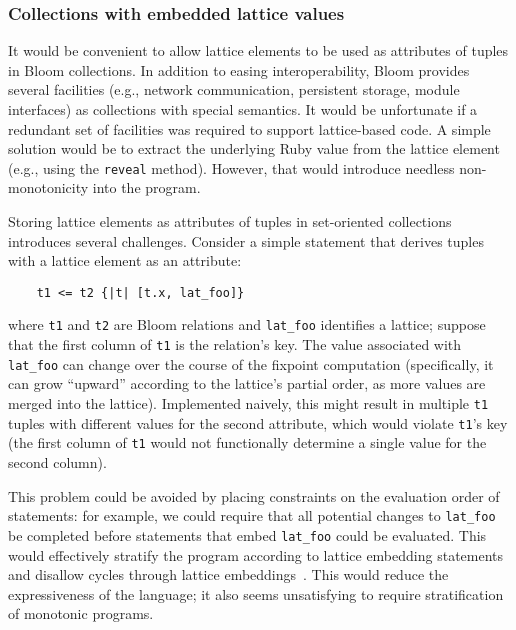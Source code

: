 \subsubsection{Collections with embedded lattice values}
\label{sec:lattice-embedding}


It would be convenient to allow lattice elements to be used as attributes of
tuples in Bloom collections. In addition to easing interoperability, Bloom
provides several facilities (e.g., network communication, persistent storage,
module interfaces) as collections with special semantics.  It would be
unfortunate if a redundant set of facilities was required to support
lattice-based code. A simple solution would be to extract the underlying Ruby
value from the lattice element (e.g., using the \texttt{reveal} method).
However, that would introduce needless non-monotonicity into the program.

Storing lattice elements as attributes of tuples in set-oriented collections
introduces several challenges. Consider a simple \lang statement that derives
tuples with a lattice element as an attribute:
\begin{verbatim}
    t1 <= t2 {|t| [t.x, lat_foo]}
\end{verbatim}
where \texttt{t1} and \texttt{t2} are Bloom relations and \texttt{lat\_foo}
identifies a lattice; suppose that the first column of \texttt{t1} is the
relation's key. The value associated with \texttt{lat\_foo} can change over the
course of the fixpoint computation (specifically, it can grow ``upward''
according to the lattice's partial order, as more values are merged into the
lattice). Implemented naively, this might result in multiple \texttt{t1} tuples
with different values for the second attribute, which would violate
\texttt{t1}'s key (the first column of \texttt{t1} would not functionally
determine a single value for the second column).

This problem could be avoided by placing constraints on the evaluation order of
statements: for example, we could require that all potential changes to
\texttt{lat\_foo} be completed before statements that embed \texttt{lat\_foo}
could be evaluated. This would effectively stratify the program according to
lattice embedding statements and disallow cycles through lattice
embeddings~\cite{Apt1988}. This would reduce the expressiveness of the language;
it also seems unsatisfying to require stratification of monotonic programs.

